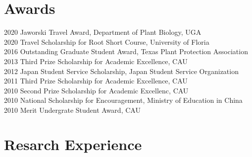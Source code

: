 \documentclass[11pt, a4paper]{awesome-cv}
\begin{document}
\section{Awards}\label{awards}

2020 Jaworski Travel Award, Department of Plant Biology, UGA\\
2020 Travel Scholarship for Root Short Course, University of Floria\\
2016 Outstanding Graduate Student Award, Texas Plant Protection
Association\\
2013 Third Prize Scholarship for Academic Excellence, CAU\\
2012 Japan Student Service Scholarship, Japan Student Service
Organization\\
2011 Third Prize Scholarship for Academic Excellence, CAU\\
2010 Second Prize Scholarship for Academic Excellenc, CAU\\
2010 National Scholarship for Encouragement, Ministry of Education in
China\\
2010 Merit Undergrate Student Award, CAU

\section{Resarch Experience}\label{resarch-experience}
\end{document}
